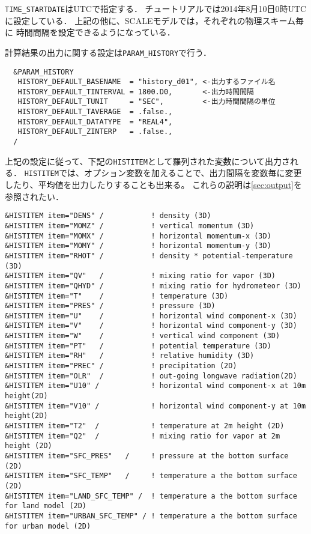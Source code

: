 \verb|TIME_STARTDATE|はUTCで指定する．
チュートリアルでは2014年8月10日0時UTCに設定している．
上記の他に、SCALEモデルでは，それぞれの物理スキーム毎に
時間間隔を設定できるようになっている．


計算結果の出力に関する設定は\verb|PARAM_HISTORY|で行う．
\begin{verbatim}
  &PARAM_HISTORY
   HISTORY_DEFAULT_BASENAME  = "history_d01", <-出力するファイル名
   HISTORY_DEFAULT_TINTERVAL = 1800.D0,       <-出力時間間隔
   HISTORY_DEFAULT_TUNIT     = "SEC",         <-出力時間間隔の単位
   HISTORY_DEFAULT_TAVERAGE  = .false.,
   HISTORY_DEFAULT_DATATYPE  = "REAL4",
   HISTORY_DEFAULT_ZINTERP   = .false.,
  /
\end{verbatim}
上記の設定に従って、下記の\verb|HISTITEM|として羅列された変数について出力される．
\verb|HISTITEM|では、オプション変数を加えることで、出力間隔を変数毎に変更したり、平均値を出力したりすることも出来る。
これらの説明は\ref{sec:output}を参照されたい．

\begin{verbatim}
&HISTITEM item="DENS" /           ! density (3D)
&HISTITEM item="MOMZ" /           ! vertical momentum (3D)
&HISTITEM item="MOMX" /           ! horizontal momentum-x (3D)
&HISTITEM item="MOMY" /           ! horizontal momentum-y (3D)
&HISTITEM item="RHOT" /           ! density * potential-temperature (3D)
&HISTITEM item="QV"   /           ! mixing ratio for vapor (3D)
&HISTITEM item="QHYD" /           ! mixing ratio for hydrometeor (3D)
&HISTITEM item="T"    /           ! temperature (3D)
&HISTITEM item="PRES" /           ! pressure (3D)
&HISTITEM item="U"    /           ! horizontal wind component-x (3D)
&HISTITEM item="V"    /           ! horizontal wind component-y (3D)
&HISTITEM item="W"    /           ! vertical wind component (3D)
&HISTITEM item="PT"   /           ! potential temperature (3D)
&HISTITEM item="RH"   /           ! relative humidity (3D)
&HISTITEM item="PREC" /           ! precipitation (2D)
&HISTITEM item="OLR"  /           ! out-going longwave radiation(2D)
&HISTITEM item="U10" /            ! horizontal wind component-x at 10m height(2D)
&HISTITEM item="V10" /            ! horizontal wind component-y at 10m height(2D)
&HISTITEM item="T2"  /            ! temperature at 2m height (2D)
&HISTITEM item="Q2"  /            ! mixing ratio for vapor at 2m height (2D)
&HISTITEM item="SFC_PRES"   /     ! pressure at the bottom surface (2D)
&HISTITEM item="SFC_TEMP"   /     ! temperature a the bottom surface (2D)
&HISTITEM item="LAND_SFC_TEMP" /  ! temperature a the bottom surface for land model (2D)
&HISTITEM item="URBAN_SFC_TEMP" / ! temperature a the bottom surface for urban model (2D)

\end{verbatim}


